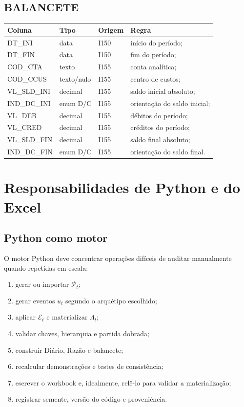 \documentclass[11pt,a4paper]{article}
\newcommand{\Plano}{\mathcal{P}}
\newcommand{\cE}{\mathcal{E}}
\begin{document}
\subsection{BALANCETE}

\begin{longtable}{p{} p{} p{} p{}}
\toprule
\textbf{Coluna} & \textbf{Tipo} & \textbf{Origem} & \textbf{Regra}\\
\midrule
DT\_INI & data & I150 & início do período;\\
DT\_FIN & data & I150 & fim do período;\\
COD\_CTA & texto & I155 & conta analítica;\\
COD\_CCUS & texto/nulo & I155 & centro de custos;\\
VL\_SLD\_INI & decimal & I155 & saldo inicial absoluto;\\
IND\_DC\_INI & enum D/C & I155 & orientação do saldo inicial;\\
VL\_DEB & decimal & I155 & débitos do período;\\
VL\_CRED & decimal & I155 & créditos do período;\\
VL\_SLD\_FIN & decimal & I155 & saldo final absoluto;\\
IND\_DC\_FIN & enum D/C & I155 & orientação do saldo final.\\
\bottomrule
\end{longtable}

\section{Responsabilidades de Python e do Excel}

\subsection{Python como motor}

O motor Python deve concentrar operações difíceis de auditar manualmente quando repetidas em escala:
\begin{enumerate}
    \item gerar ou importar $\Plano_t$;
    \item gerar eventos $u_t$ segundo o arquétipo escolhido;
    \item aplicar $\cE_t$ e materializar $\Lambda_t$;
    \item validar chaves, hierarquia e partida dobrada;
    \item construir Diário, Razão e balancete;
    \item recalcular demonstrações e testes de consistência;
    \item escrever o workbook e, idealmente, relê-lo para validar a materialização;
    \item registrar semente, versão do código e proveniência.
\end{enumerate}
\end{document}
